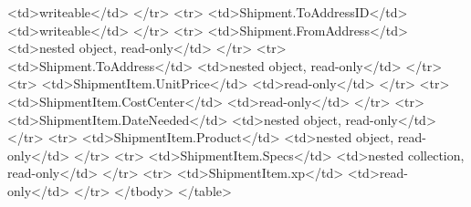 \documentclass{memoir}%
\begin{document}
<td>writeable</td>\newline%
</tr>\newline%
<tr>\newline%
<td>Shipment.ToAddressID</td>\newline%
<td>writeable</td>\newline%
</tr>\newline%
<tr>\newline%
<td>Shipment.FromAddress</td>\newline%
<td>nested object, read{-}only</td>\newline%
</tr>\newline%
<tr>\newline%
<td>Shipment.ToAddress</td>\newline%
<td>nested object, read{-}only</td>\newline%
</tr>\newline%
<tr>\newline%
<td>ShipmentItem.UnitPrice</td>\newline%
<td>read{-}only</td>\newline%
</tr>\newline%
<tr>\newline%
<td>ShipmentItem.CostCenter</td>\newline%
<td>read{-}only</td>\newline%
</tr>\newline%
<tr>\newline%
<td>ShipmentItem.DateNeeded</td>\newline%
<td>nested object, read{-}only</td>\newline%
</tr>\newline%
<tr>\newline%
<td>ShipmentItem.Product</td>\newline%
<td>nested object, read{-}only</td>\newline%
</tr>\newline%
<tr>\newline%
<td>ShipmentItem.Specs</td>\newline%
<td>nested collection, read{-}only</td>\newline%
</tr>\newline%
<tr>\newline%
<td>ShipmentItem.xp</td>\newline%
<td>read{-}only</td>\newline%
</tr>\newline%
</tbody>\newline%
</table>\newline%
\end{document}
